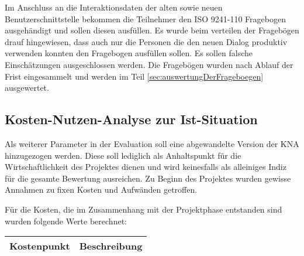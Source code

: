 Im Anschluss an die Interaktionsdaten der alten sowie neuen Benutzerschnittstelle bekommen die Teilnehmer den ISO 9241-110 Fragebogen ausgehändigt und sollen diesen ausfüllen. Es wurde beim verteilen der Fragebögen drauf hingewiesen, dass auch nur die Personen die den neuen Dialog produktiv verwenden konnten den Fragebogen ausfüllen sollen. Es sollen falsche Einschätzungen ausgeschlossen werden. Die Fragebögen wurden nach Ablauf der Frist eingesammelt und werden im Teil \ref{sec:auswertungDerFrageboegen} ausgewertet.


\subsection{Kosten-Nutzen-Analyse zur Ist-Situation}
Als weiterer Parameter in der Evaluation soll eine abgewandelte Version der \gls{KNA} hinzugezogen werden. Diese soll lediglich als Anhaltspunkt für die Wirtschaftlichkeit des Projektes dienen und wird keinesfalls als alleiniges Indiz für die gesamte Bewertung ausreichen. Zu Beginn des Projektes wurden gewisse Annahmen zu fixen Kosten und Aufwänden getroffen.

Für die Kosten, die im Zusammenhang mit der Projektphase entstanden sind wurden folgende Werte berechnet:
\begin{center}
\begin{longtable}{|p{5.1cm}|p{9.5cm}|} 
\hline
\textbf{Kostenpunkt} & \textbf{Beschreibung} \\ \hline
\end{longtable}
\end{center}